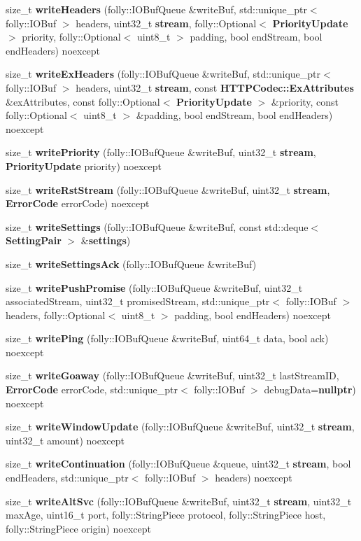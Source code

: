 \begin{DoxyCompactItemize}
\item 
size\+\_\+t {\bf write\+Headers} (folly\+::\+I\+O\+Buf\+Queue \&write\+Buf, std\+::unique\+\_\+ptr$<$ folly\+::\+I\+O\+Buf $>$ headers, uint32\+\_\+t {\bf stream}, folly\+::\+Optional$<$ {\bf Priority\+Update} $>$ priority, folly\+::\+Optional$<$ uint8\+\_\+t $>$ padding, bool end\+Stream, bool end\+Headers) noexcept
\item 
size\+\_\+t {\bf write\+Ex\+Headers} (folly\+::\+I\+O\+Buf\+Queue \&write\+Buf, std\+::unique\+\_\+ptr$<$ folly\+::\+I\+O\+Buf $>$ headers, uint32\+\_\+t {\bf stream}, const {\bf H\+T\+T\+P\+Codec\+::\+Ex\+Attributes} \&ex\+Attributes, const folly\+::\+Optional$<$ {\bf Priority\+Update} $>$ \&priority, const folly\+::\+Optional$<$ uint8\+\_\+t $>$ \&padding, bool end\+Stream, bool end\+Headers) noexcept
\item 
size\+\_\+t {\bf write\+Priority} (folly\+::\+I\+O\+Buf\+Queue \&write\+Buf, uint32\+\_\+t {\bf stream}, {\bf Priority\+Update} priority) noexcept
\item 
size\+\_\+t {\bf write\+Rst\+Stream} (folly\+::\+I\+O\+Buf\+Queue \&write\+Buf, uint32\+\_\+t {\bf stream}, {\bf Error\+Code} error\+Code) noexcept
\item 
size\+\_\+t {\bf write\+Settings} (folly\+::\+I\+O\+Buf\+Queue \&write\+Buf, const std\+::deque$<$ {\bf Setting\+Pair} $>$ \&{\bf settings})
\item 
size\+\_\+t {\bf write\+Settings\+Ack} (folly\+::\+I\+O\+Buf\+Queue \&write\+Buf)
\item 
size\+\_\+t {\bf write\+Push\+Promise} (folly\+::\+I\+O\+Buf\+Queue \&write\+Buf, uint32\+\_\+t associated\+Stream, uint32\+\_\+t promised\+Stream, std\+::unique\+\_\+ptr$<$ folly\+::\+I\+O\+Buf $>$ headers, folly\+::\+Optional$<$ uint8\+\_\+t $>$ padding, bool end\+Headers) noexcept
\item 
size\+\_\+t {\bf write\+Ping} (folly\+::\+I\+O\+Buf\+Queue \&write\+Buf, uint64\+\_\+t data, bool ack) noexcept
\item 
size\+\_\+t {\bf write\+Goaway} (folly\+::\+I\+O\+Buf\+Queue \&write\+Buf, uint32\+\_\+t last\+Stream\+ID, {\bf Error\+Code} error\+Code, std\+::unique\+\_\+ptr$<$ folly\+::\+I\+O\+Buf $>$ debug\+Data={\bf nullptr}) noexcept
\item 
size\+\_\+t {\bf write\+Window\+Update} (folly\+::\+I\+O\+Buf\+Queue \&write\+Buf, uint32\+\_\+t {\bf stream}, uint32\+\_\+t amount) noexcept
\item 
size\+\_\+t {\bf write\+Continuation} (folly\+::\+I\+O\+Buf\+Queue \&queue, uint32\+\_\+t {\bf stream}, bool end\+Headers, std\+::unique\+\_\+ptr$<$ folly\+::\+I\+O\+Buf $>$ headers) noexcept
\item 
size\+\_\+t {\bf write\+Alt\+Svc} (folly\+::\+I\+O\+Buf\+Queue \&write\+Buf, uint32\+\_\+t {\bf stream}, uint32\+\_\+t max\+Age, uint16\+\_\+t port, folly\+::\+String\+Piece protocol, folly\+::\+String\+Piece host, folly\+::\+String\+Piece origin) noexcept
\end{DoxyCompactItemize}
